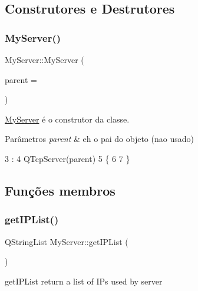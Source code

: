 \subsection{Construtores e Destrutores}
\mbox{\label{class_my_server_ac9e5ca7b551a5df90d5b39260f7e5404}} 
\subsubsection{\texorpdfstring{My\+Server()}{MyServer()}}
{\footnotesize\ttfamily My\+Server\+::\+My\+Server (\begin{DoxyParamCaption}\item[{Q\+Object $\ast$}]{parent = {} }\end{DoxyParamCaption})}



\mbox{\hyperlink{class_my_server}{My\+Server}} é o construtor da classe. 


\begin{DoxyParams}{Parâmetros}
{\em parent} & eh o pai do objeto (nao usado) \\
\hline
\end{DoxyParams}

\begin{DoxyCode}
3                                   :
4   QTcpServer(parent)
5 \{
6 
7 \}
\end{DoxyCode}


\subsection{Funções membros}
\mbox{\label{class_my_server_ac10d498dcc2b5d691f131f17b6602a59}} 
\subsubsection{\texorpdfstring{get\+I\+P\+List()}{getIPList()}}
{\footnotesize\ttfamily Q\+String\+List My\+Server\+::get\+I\+P\+List (\begin{DoxyParamCaption}{ }\end{DoxyParamCaption})}



get\+I\+P\+List return a list of I\+Ps used by server 

